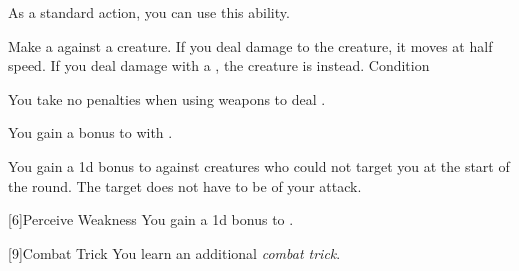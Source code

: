              As a standard action, you can use this ability.
            \begin{ability}
                \begin{spelleffects}
                    \spelleffect Make a  against a creature.
                    If you deal damage to the creature, it moves at half speed.
                    If you deal damage with a , the creature is \immobilized instead.
                    \spelldur Condition
                \end{spelleffects}
            \end{ability}

             You take no penalties when using weapons to deal .


             You gain a  bonus to  with .

            You gain a \plus1d bonus to  against creatures who could not target you at the start of the round.
            The target does not have to be \unaware of your attack.

            [6]{Perceive Weakness}
            You gain a \plus1d bonus to .

            [9]{Combat Trick}
            You learn an additional \textit{combat trick}.

